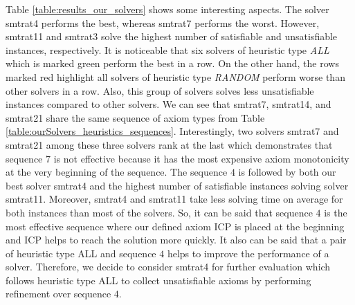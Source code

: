 \noindent Table \ref{table:results_our_solvers} shows some interesting aspects.
The solver smtrat4 performs the best, whereas smtrat7 performs the worst.
However, smtrat11 and smtrat3 solve the highest number of satisfiable and unsatisfiable instances, respectively.
It is noticeable that six solvers of heuristic type \textit{ALL} which is marked green perform the best in a row.
On the other hand, the rows marked red   highlight all solvers of heuristic type \textit{RANDOM} perform worse than other solvers in a row.
Also, this group of solvers solves less unsatisfiable instances compared to other solvers.
We can see that smtrat7, smtrat14, and smtrat21 share the same sequence of axiom types from Table \ref{table:ourSolvers_heuristics_sequences}.
Interestingly, two solvers smtrat7 and smtrat21 among these three solvers rank at the last which demonstrates that sequence $7$ is not effective because it has the most expensive axiom monotonicity at the very beginning of the sequence.
The sequence $4$ is followed by both our best solver smtrat4 and the highest number of satisfiable instances solving solver smtrat11.
Moreover, smtrat4 and smtrat11 take less solving time on average for both instances than most of the solvers.
So, it can be said that sequence $4$ is the most effective sequence where our defined axiom ICP is placed at the beginning and ICP helps to reach the solution more quickly.
It also can be said that a pair of heuristic type ALL and sequence $4$ helps to improve the performance of a solver.
Therefore, we decide to consider smtrat4  for further evaluation which follows heuristic type ALL to collect unsatisfiable axioms by performing refinement over sequence $4$.\newline

